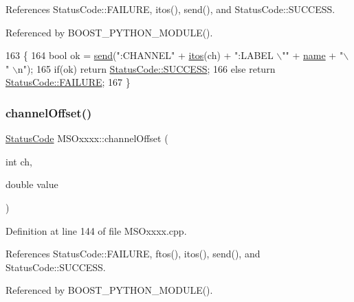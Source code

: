 References Status\+Code\+::\+F\+A\+I\+L\+U\+RE, itos(), send(), and Status\+Code\+::\+S\+U\+C\+C\+E\+SS.



Referenced by B\+O\+O\+S\+T\+\_\+\+P\+Y\+T\+H\+O\+N\+\_\+\+M\+O\+D\+U\+L\+E().


\begin{DoxyCode}
163 \{
164     \textcolor{keywordtype}{bool} ok = \hyperlink{classMSOxxxx_ae77668a1ae4ccb74e0ed5f2485dfdebf}{send}(\textcolor{stringliteral}{":CHANNEL"} + \hyperlink{Tools_8h_af330027dbdafb9a30768b3613c553e60}{itos}(ch) + \textcolor{stringliteral}{":LABEL \(\backslash\)""} + \hyperlink{classObject_a300f4c05dd468c7bb8b3c968868443c1}{name} + \textcolor{stringliteral}{"\(\backslash\)" \(\backslash\)n"});
165     \textcolor{keywordflow}{if}(ok)  \textcolor{keywordflow}{return} \hyperlink{classStatusCode_a6f565cbeadc76d14c72f047e5e85eb4badd0da38d3ba0d922efd1f4619bc37ad8}{StatusCode::SUCCESS};
166     \textcolor{keywordflow}{else}        \textcolor{keywordflow}{return} \hyperlink{classStatusCode_a6f565cbeadc76d14c72f047e5e85eb4ba3da73d4c469762eb9d3c960368252b26}{StatusCode::FAILURE};  
167 \}
\end{DoxyCode}
\mbox{\label{classMSOxxxx_ab77c05543d9478b140466b7505651ab8}} 
\subsubsection{\texorpdfstring{channel\+Offset()}{channelOffset()}}
{\footnotesize\ttfamily \hyperlink{classStatusCode}{Status\+Code} M\+S\+Oxxxx\+::channel\+Offset (\begin{DoxyParamCaption}\item[{int}]{ch,  }\item[{double}]{value }\end{DoxyParamCaption})}



Definition at line 144 of file M\+S\+Oxxxx.\+cpp.



References Status\+Code\+::\+F\+A\+I\+L\+U\+RE, ftos(), itos(), send(), and Status\+Code\+::\+S\+U\+C\+C\+E\+SS.



Referenced by B\+O\+O\+S\+T\+\_\+\+P\+Y\+T\+H\+O\+N\+\_\+\+M\+O\+D\+U\+L\+E().


